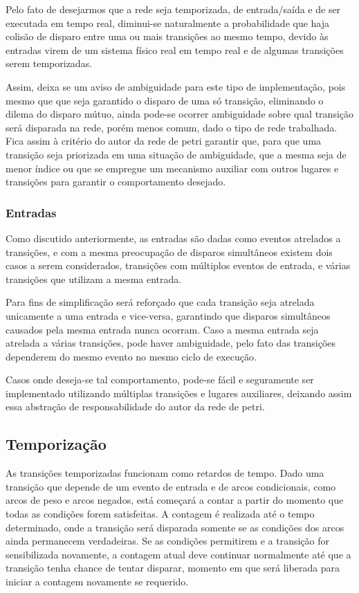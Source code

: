 Pelo fato de desejarmos que a rede seja temporizada, de entrada/saída e de ser executada em tempo real, diminui-se naturalmente a probabilidade que haja colisão de disparo entre uma ou mais transições ao mesmo tempo, devido às entradas virem de um sistema físico real em tempo real e de algumas transições serem temporizadas. 

Assim, deixa se um aviso de ambiguidade para este tipo de implementação, pois mesmo que que seja garantido o disparo de uma só transição, eliminando o dilema do disparo mútuo, ainda pode-se ocorrer ambiguidade sobre qual transição será disparada na rede, porém menos comum, dado o tipo de rede trabalhada. Fica assim à critério do autor da rede de petri garantir que, para que uma transição seja priorizada em uma situação de ambiguidade, que a mesma seja de menor índice ou que se empregue um mecanismo auxiliar com outros lugares e transições para garantir o comportamento desejado. 

\subsubsection{Entradas}

Como discutido anteriormente, as entradas são dadas como eventos atrelados a transições, e com a mesma preocupação de disparos simultâneos existem dois casos a serem considerados, transições com múltiplos eventos de entrada, e várias transições que utilizam a mesma entrada.

Para fins de simplificação será reforçado que cada transição seja atrelada unicamente a uma entrada e vice-versa, garantindo que disparos simultâneos causados pela mesma entrada nunca ocorram. Caso a mesma entrada seja atrelada a várias transições, pode haver ambiguidade, pelo fato das transições dependerem do mesmo evento no mesmo ciclo de execução.

Casos onde deseja-se tal comportamento, pode-se fácil e seguramente ser implementado utilizando múltiplas transições e lugares auxiliares, deixando assim essa abstração de responsabilidade do autor da rede de petri.

\subsection{Temporização}
\label{section:delay}

As transições temporizadas funcionam como retardos de tempo. Dado uma transição que depende de um evento de entrada e de arcos condicionais, como arcos de peso e arcos negados, está começará a contar a partir do momento que todas as condições forem satisfeitas. A contagem é realizada até o tempo determinado, onde a transição será disparada somente se as condições dos arcos ainda permanecem verdadeiras. Se as condições permitirem e a transição for sensibilizada novamente, a contagem atual deve continuar normalmente até que a transição tenha chance de tentar disparar, momento em que será liberada para iniciar a contagem novamente se requerido. 

